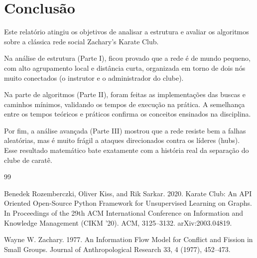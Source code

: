 \documentclass[sigconf,nonacm]{webmedia}
\begin{document}
\section{Conclusão}

Este relatório atingiu os objetivos de analisar a estrutura e avaliar os algoritmos sobre a clássica rede social {Zachary's Karate Club}.

Na análise de estrutura (Parte I), ficou provado que a rede é de mundo pequeno, com alto agrupamento local e distância curta, organizada em torno de dois nós muito conectados (o instrutor e o administrador do clube).

Na parte de algoritmos (Parte II), foram feitas as implementações das buscas e caminhos mínimos, validando os tempos de execução na prática. A semelhança entre os tempos teóricos e práticos confirma os conceitos ensinados na disciplina.

Por fim, a análise avançada (Parte III) mostrou que a rede resiste bem a falhas aleatórias, mas é muito frágil a ataques direcionados contra os líderes (hubs). Esse resultado matemático bate exatamente com a história real da separação do clube de caratê.



\begin{thebibliography}{99}

Benedek Rozemberczki, Oliver Kiss, and Rik Sarkar. 2020. Karate Club: An API Oriented Open-Source Python Framework for Unsupervised Learning on Graphs. In  {Proceedings of the 29th ACM International Conference on Information and Knowledge Management (CIKM '20)}. ACM, 3125--3132. arXiv:2003.04819.

Wayne W. Zachary. 1977. An Information Flow Model for Conflict and Fission in Small Groups.  {Journal of Anthropological Research} 33, 4 (1977), 452--473.

\end{thebibliography}
\end{document}

